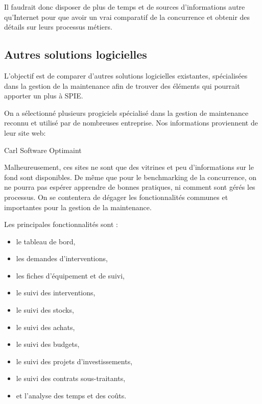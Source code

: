 Il faudrait donc disposer de plus de temps et de sources d'informations autre qu'Internet pour que avoir un vrai comparatif de la concurrence et obtenir des détails sur leurs processus métiers.

\subsection{Autres solutions logicielles}

L’objectif est de comparer d’autres solutions logicielles existantes, spécialisées dans la gestion de la maintenance afin de trouver des éléments qui pourrait apporter un plus à SPIE.

On a sélectionné plusieurs progiciels spécialisé dans la gestion de maintenance reconnu et utilisé par de nombreuses entreprise. Nos informations proviennent de leur site web:

Carl Software\footnotemark
Optimaint\footnotemark


Malheureusement, ces sites ne sont que des vitrines et peu d’informations sur le fond sont disponibles. De même que pour le benchmarking de la concurrence, on ne pourra pas espérer apprendre de bonnes pratiques, ni comment sont gérés les processus. On se contentera de dégager les fonctionnalités communes et importantes pour la gestion de la maintenance.

Les principales fonctionnalités sont :

\begin{itemize}
\item le tableau de bord,
\item les demandes d’interventions,
\item les fiches d'équipement et de suivi,
\item le suivi des interventions,
\item le suivi des stocks,
\item le suivi des achats,
\item le suivi des budgets,
\item le suivi des projets d’investissements,
\item le suivi des contrats sous-traitants,
\item et l'analyse des temps et des coûts.
\end{itemize}

